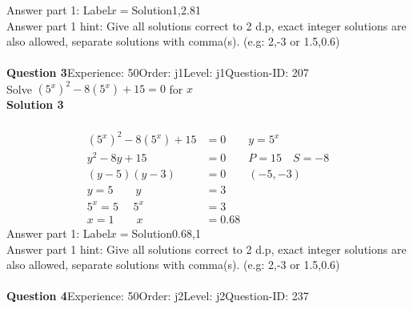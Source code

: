 \documentclass{article}
\begin{document}
Answer part 1: \hspace{10pt}Label\hspace{10pt}$x=$\hspace{10pt}Solution\hspace{10pt}1,2.81\\
Answer part 1 hint: \hspace{15pt} Give all solutions correct to 2 d.p, exact integer solutions are also allowed, separate solutions with comma(s). (e.g: 2,-3 or 1.5,0.6)\\
\\[4pt]
\noindent\textbf{Question 3}\hspace{20pt}Experience: 50\hspace{20pt}Order: j1\hspace{20pt}Level: j1\hspace{20pt}Question-ID: 207\\[2pt]
Solve $(5^x)^2-8(5^x)+15=0$ for $x$\\[4pt]
\noindent\textbf{Solution 3}\\[2pt]
\\[-35pt]\begin{align*}
(5^x)^2-8(5^x)+15&=0\qquad y=5^x\\[2pt]
y^2-8y+15&=0\qquad P=15 \quad S=-8\\[2pt]
(y-5)(y-3)&=0\qquad (-5,-3)\\[2pt]
y=5 \qquad y&=3\\[2pt]
5^x=5\hspace{16pt} 5^x&=3\\[2pt]
x=1 \qquad x&=0.68
\end{align*}
Answer part 1: \hspace{10pt}Label\hspace{10pt}$x=$\hspace{10pt}Solution\hspace{10pt}0.68,1\\
Answer part 1 hint: \hspace{15pt} Give all solutions correct to 2 d.p, exact integer solutions are also allowed, separate solutions with comma(s). (e.g: 2,-3 or 1.5,0.6)\\
\\[4pt]
\noindent\textbf{Question 4}\hspace{20pt}Experience: 50\hspace{20pt}Order: j2\hspace{20pt}Level: j2\hspace{20pt}Question-ID: 237\\[2pt]
\end{document}
